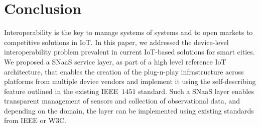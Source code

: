 \documentclass[conference]{IEEEtran}
\begin{document}
\section{Conclusion}
Interoperability is the key to manage systems of systems and to open markets to competitive solutions in IoT.
In this paper, we addressed the device-level interoperability problem prevalent in current IoT-based solutions for smart cities.
We proposed a SNaaS service layer, as part of a high level reference IoT architecture, that enables the creation of the plug-n-play infrastructure across platforms from multiple device vendors and implement it using the self-describing feature outlined in the existing IEEE~$1451$ standard.
Such a SNaaS layer enables transparent management of sensors and collection of observational data, and depending on the domain, the layer can be implemented using existing standards from IEEE or W$3$C.


 
\end{document}
